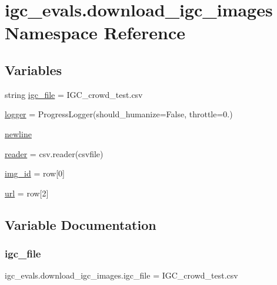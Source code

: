 \hypertarget{namespaceigc__evals_1_1download__igc__images}{}\section{igc\+\_\+evals.\+download\+\_\+igc\+\_\+images Namespace Reference}
\label{namespaceigc__evals_1_1download__igc__images}
\subsection*{Variables}
\begin{DoxyCompactItemize}
\item 
string \hyperlink{namespaceigc__evals_1_1download__igc__images_af95507468b67fe453dfd4d7254b894ba}{igc\+\_\+file} = \textquotesingle{}I\+G\+C\+\_\+crowd\+\_\+test.\+csv\textquotesingle{}
\item 
\hyperlink{namespaceigc__evals_1_1download__igc__images_a2e1a18a09c8fdce914fe05bf1edb2cbf}{logger} = Progress\+Logger(should\+\_\+humanize=False, throttle=0.)
\item 
\hyperlink{namespaceigc__evals_1_1download__igc__images_af40decbeaa6737bece45e82196187a6e}{newline}
\item 
\hyperlink{namespaceigc__evals_1_1download__igc__images_a65884ad37b29b4934eb02580a2d8eb8f}{reader} = csv.\+reader(csvfile)
\item 
\hyperlink{namespaceigc__evals_1_1download__igc__images_a9b32fa34510e7ba895010636c9310a5d}{img\+\_\+id} = row\mbox{[}0\mbox{]}
\item 
\hyperlink{namespaceigc__evals_1_1download__igc__images_aa45d448341160f30b2fdd7bbc078d970}{url} = row\mbox{[}2\mbox{]}
\end{DoxyCompactItemize}


\subsection{Variable Documentation}
\mbox{\label{namespaceigc__evals_1_1download__igc__images_af95507468b67fe453dfd4d7254b894ba}} 
\subsubsection{\texorpdfstring{igc\+\_\+file}{igc\_file}}
{\footnotesize\ttfamily igc\+\_\+evals.\+download\+\_\+igc\+\_\+images.\+igc\+\_\+file = \textquotesingle{}I\+G\+C\+\_\+crowd\+\_\+test.\+csv\textquotesingle{}}



